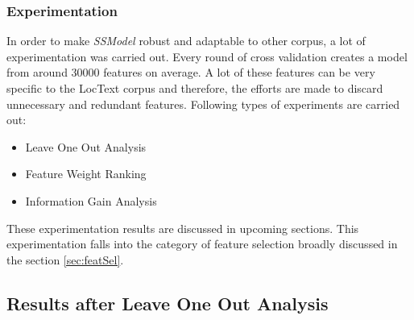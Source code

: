 \subsubsection{Experimentation}

In order to make \textit{SSModel} robust and adaptable to other corpus, a lot of experimentation was carried out. Every round of cross validation creates a model from around 30000 features on average. A lot of these features can be very specific to the LocText corpus and therefore, the efforts are made to discard unnecessary and redundant features. Following types of experiments are carried out:

\begin{itemize}

\item Leave One Out Analysis

\item Feature Weight Ranking

\item Information Gain Analysis

\end{itemize}

These experimentation results are discussed in upcoming sections. This experimentation falls into the category of feature selection broadly discussed in the section \ref{sec:featSel}.

\subsection{Results after Leave One Out Analysis}

